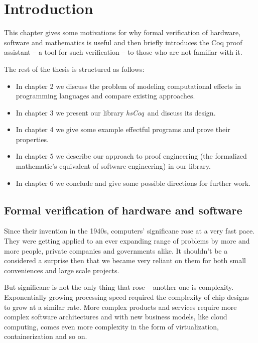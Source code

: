 \documentclass[declaration,inz,english,shortabstract]{iithesis}
\author         {Zeimer}
\date           {wrzesień 2019}                     %
\newcommand{\libname}{\textit{hsCoq}}
\begin{document}

\chapter{Introduction}

This chapter gives some motivations for why formal verification of hardware, software and mathematics is useful and then briefly introduces the Coq proof assistant -- a tool for such verification -- to those who are not familiar with it.

The rest of the thesis is structured as follows:

\begin{itemize}
    \item In chapter 2 we discuss the problem of modeling computational effects in programming languages and compare existing approaches.
    \item In chapter 3 we present our library \libname\ and discuss its design.
    \item In chapter 4 we give some example effectful programs and prove their properties.
    \item In chapter 5 we describe our approach to proof engineering (the formalized mathematic's equivalent of software engineering) in our library.
    \item In chapter 6 we conclude and give some possible directions for further work.
\end{itemize}

\section{Formal verification of hardware and software}

Since their invention in the 1940s, computers' significane rose at a very fast pace. They were getting applied to an ever expanding range of problems by more and more people, private companies and governments alike. It shouldn't be a considered a surprise then that we became very reliant on them for both small conveniences and large scale projects.

But significane is not the only thing that rose -- another one is complexity. Exponentially growing processing speed required the complexity of chip designs to grow at a similar rate. More complex products and services require more complex software architectures and with new business models, like cloud computing, comes even more complexity in the form of virtualization, containerization and so on.
\end{document}

